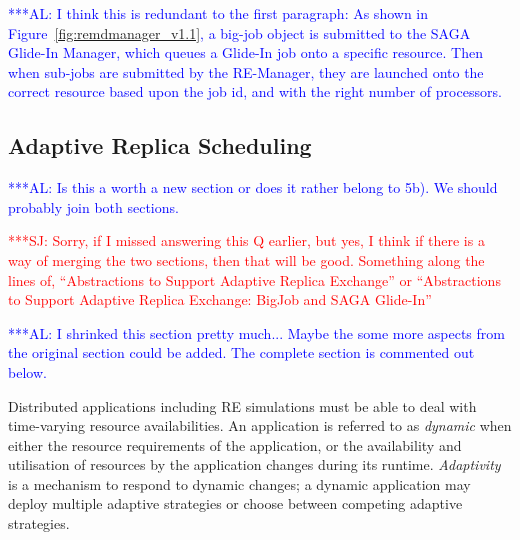 \documentclass{rspublic}
\newcommand{\alnote}[1]{ {\textcolor{blue} { ***AL: #1 }}}
\newcommand{\jhanote}[1]{ {\textcolor{red} { ***SJ: #1 }}}
\newcommand{\alnote}[1]{}
\newcommand{\jhanote}[1]{}
\begin{document}
\alnote{I think this is redundant to the first paragraph: As 
shown in Figure~\ref{fig:remdmanager_v1.1}, a big-job object is
submitted to the SAGA Glide-In Manager, which queues a Glide-In job
onto a specific resource. Then when sub-jobs are submitted by the
RE-Manager, they are launched onto the correct resource based upon the
job id, and with the right number of processors.  }


\subsection{Adaptive Replica Scheduling}
\label{sec:adaptivitiy}    
\alnote{Is this a worth a new section or does it rather belong to
  5b). We should probably join both sections.}  

\jhanote{Sorry, if I missed answering this Q earlier, but yes, I think
  if there is a way of merging the two sections, then that will be
  good. Something along the lines of, ``Abstractions to Support
  Adaptive Replica Exchange'' or ``Abstractions to Support Adaptive
  Replica Exchange: BigJob and SAGA Glide-In''}

\alnote{I shrinked this section pretty much... Maybe the some more
    aspects from the original section could be added. The complete
    section is commented out below.}

Distributed applications including RE simulations must be able to 
deal with time-varying resource availabilities.
An application is referred to as \emph{dynamic} when either the
resource requirements of the application, or the availability and
utilisation of resources by the application changes during its
runtime.  \emph{Adaptivity} is a mechanism to respond to dynamic
changes; %
a dynamic application may deploy multiple adaptive strategies or
choose between competing adaptive strategies.
\end{document}
